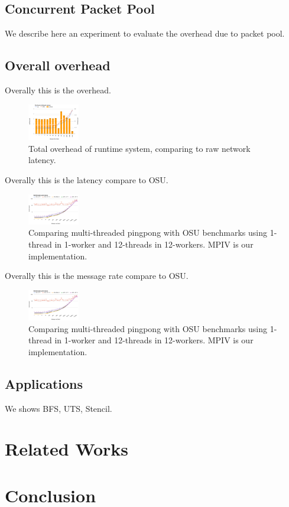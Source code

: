 \documentclass{sig-alternate-05-2015}
\begin{document}
\subsection{Concurrent Packet Pool}
We describe here an experiment to evaluate the overhead due to packet pool.


\subsection{Overall overhead}
Overally this is the overhead.
\begin{figure}[h!]
  \centering 
  \includegraphics[width=0.2\textwidth]{fig/overhead.png}
  \caption{Total overhead of runtime system, comparing to raw network latency.}
\end{figure}

Overally this is the latency compare to OSU.
\begin{figure}[h!]
  \centering 
  \includegraphics[width=0.2\textwidth]{fig/pingpong.png}
  \caption{Comparing multi-threaded pingpong with OSU benchmarks using 1-thread
  in 1-worker and 12-threads in 12-workers. MPIV is our implementation.}
\end{figure}

Overally this is the message rate compare to OSU.
\begin{figure}[h!]
  \centering 
  \includegraphics[width=0.2\textwidth]{fig/pingpong.png}
  \caption{Comparing multi-threaded pingpong with OSU benchmarks using 1-thread
  in 1-worker and 12-threads in 12-workers. MPIV is our implementation.}
\end{figure}

\subsection{Applications}
We shows BFS, UTS, Stencil.
\section{Related Works}
\label{sec:related}
\section{Conclusion}
\label{sec:conclusion}



\end{document}
